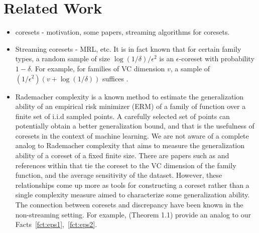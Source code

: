 \documentclass[anon,12pt]{colt2019} %
\newcommand{\zk}[1]{\textcolor{red}{ZK: #1}}
\newcommand{\eps}{\epsilon}
\begin{document}
\section{Related Work}
\begin{itemize}
\item coresets - motivation, some papers, streaming algorithms for coresets.

\item Streaming coresets - MRL, etc. It is in fact known that for certain family types, a random sample of size $\log(1/\delta)/\eps^2$ is an $\eps$-coreset with probability $1-\delta$. For example, for families of VC dimension $v$, a sample of $(1/\eps^2)(v+\log(1/\delta))$ suffices \cite{talagrand1994sharper}.

\item Rademacher complexity \cite{Bartlett:2003:RGC:944919.944944} is a known method to estimate the generalization ability of an empirical risk minimizer (ERM) of a family of function over a finite set of i.i.d sampled points. A carefully selected set of points can potentially obtain a better generalization bound, and that is the usefulness of coresets in the context of machine learning. We are not aware of a complete analog to Rademacher complexity that aims to measure the generalization ability of a coreset of a fixed finite size. There are papers such as \cite{langberg2010universal, tolochinsky2018coresets} and references within that tie the coreset to the VC dimension of the family function, and the average sensitivity of the dataset. However, these relationships come up more as tools for constructing a coreset rather than a single complexity measure aimed to characterize some generalization ability. The connection between coresets and discrepancy have been known in the non-streaming setting. For example, \cite{phillips2009small} (Theorem 1.1) provide an analog to our Facts~\ref{fct:eps1},~\ref{fct:eps2}.
%

%


\end{itemize}
\end{document}
